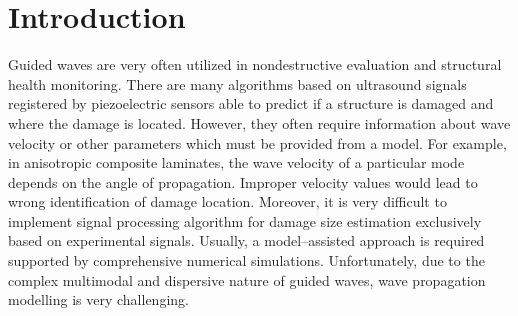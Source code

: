 \documentclass[12pt]{iopart}
\begin{document}
%
\submitto{\SMS}
%
% 
%



\section{Introduction}\label{sec1}

Guided waves are very often utilized in nondestructive evaluation and structural health monitoring. There are many algorithms based on ultrasound signals registered by piezoelectric sensors able to predict if a structure is damaged and where the damage is located. However, they often require information about wave velocity or other parameters which must be provided from a model. For example, in anisotropic composite laminates, the wave velocity of a particular mode depends on the angle of propagation. Improper velocity values would lead to wrong identification of damage location.  Moreover, it is very difficult to implement signal processing algorithm for damage size estimation exclusively based on experimental signals. Usually, a model--assisted approach is required supported by comprehensive numerical simulations. Unfortunately, due to the complex multimodal and dispersive nature of guided waves, wave propagation modelling is very challenging. 
\end{document}
